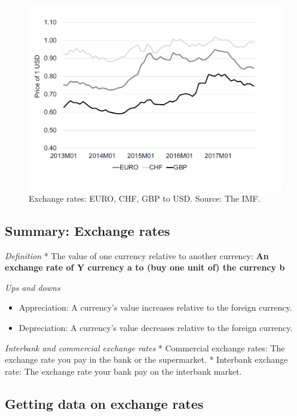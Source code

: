\documentclass[]{book}
\providecommand{\tightlist}{%
  \setlength{\itemsep}{0pt}\setlength{\parskip}{0pt}}
\begin{document}
\begin{figure}

{\centering \includegraphics[width=0.7\linewidth]{_resources/chapter_money/ex5} 

}

\caption{Exchange rates: EURO, CHF, GBP to USD. Source: The IMF.}\label{fig:money4}
\end{figure}

\hypertarget{summary-exchange-rates}{%
\subsection{Summary: Exchange rates}\label{summary-exchange-rates}}

\emph{Definition}
* The value of one currency relative to another currency: \textbf{An exchange rate of Y currency a to (buy one unit of) the currency b}

\emph{Ups and downs}

\begin{itemize}
\tightlist
\item
  Appreciation: A currency's value increases relative to the foreign currency.
\item
  Depreciation: A currency's value decreases relative to the foreign currency.
\end{itemize}

\emph{Interbank and commercial exchange rates}
* Commercial exchange rates: The exchange rate you pay in the bank or the supermarket.
* Interbank exchange rate: The exchange rate your bank pay on the interbank market.

\hypertarget{getting-data-on-exchange-rates}{%
\subsection{Getting data on exchange rates}\label{getting-data-on-exchange-rates}}
\end{document}
